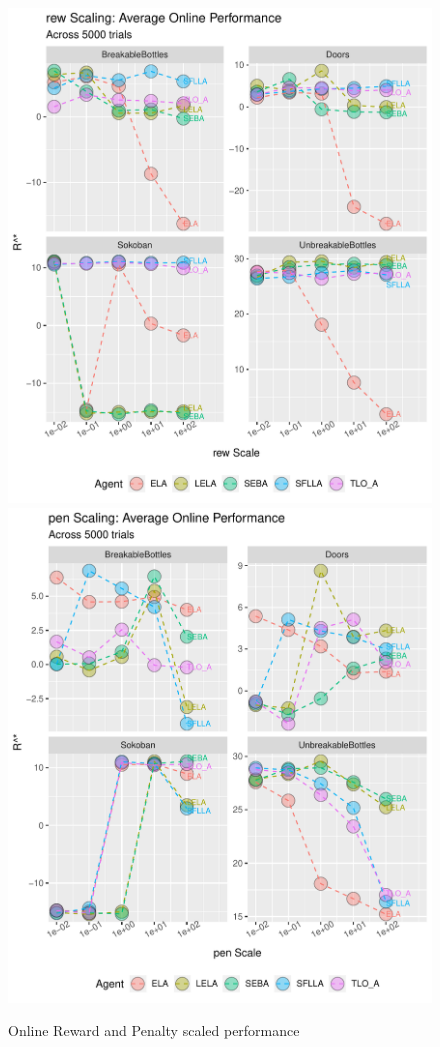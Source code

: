 \begin{figure}[h]
  \includegraphics[width=\columnwidth]{output/onlinerew.pdf}
  \includegraphics[width=\columnwidth]{output/onlinepen.pdf}
  \caption{Online Reward and Penalty scaled performance}
   \label{fig:online_performance}
 \end{figure}

